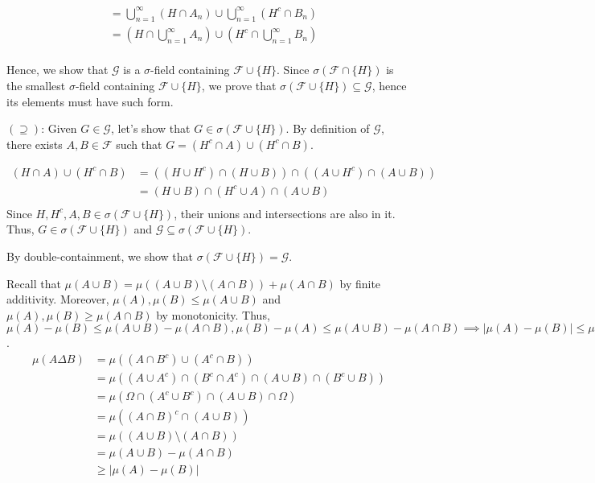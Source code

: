 \documentclass[12pt]{article}
\begin{document}
\begin{problem}[2]
\begin{enumerate}[label=(\roman*)]
\begin{align*}
						     &= \bigcup_{ n =1}^{\infty} (H \cap A_n) \cup \bigcup_{ n =1}^{\infty} (H^{c} \cap B_n) \\
						     &= \left(H \cap \bigcup_{ n =1}^{\infty} A_n \right) \cup \left(H^{c} \cap \bigcup_{ n =1}^{\infty} B_n \right) \\
		\end{align*}
\end{enumerate}
Hence, we show that $ \mathcal{G}$ is a $\sigma$-field containing $ \mathcal{F} \cup \{H\} $. Since $ \sigma(\mathcal{F} \cap \{H\}) $ is the smallest $\sigma$-field containing $ \mathcal{F} \cup \{H\} $, we prove that $ \sigma(\mathcal{F} \cup  \{H\} ) \subseteq \mathcal{G}$, hence its elements must have such form.

$ ( \supseteq )$: Given $ G \in \mathcal{G}$, let's show that $ G \in \sigma(\mathcal{F} \cup \{H\}) $. By definition of $ \mathcal{G}$, there exists $ A,B \in \mathcal{F}$ such that $ G= (H ^{c} \cap A) \cup (H^{c} \cap B)$.

\begin{align*}
	(H \cap A) \cup (H^{c} \cap B) &= ((H \cup H^{c}) \cap (H \cup B)) \cap ((A \cup H^{c}) \cap (A \cup B))\\
				       &= (H \cup B) \cap (H^{c} \cup A) \cap (A \cup B)  \\
\end{align*}
Since $ H, H^{c}, A, B \in \sigma(\mathcal{F} \cup \{H\} )$, their unions and intersections are also in it. Thus, $ G \in \sigma(\mathcal{F} \cup \{H\} )$ and $ \mathcal{G} \subseteq \sigma(\mathcal{F} \cup \{H\} )$.

By double-containment, we show that $ \sigma(\mathcal{F} \cup \{H\} ) = \mathcal{G}$.
\end{problem}

\begin{problem}[3]

	Recall that $ \mu(A \cup B) = \mu((A \cup B) \setminus (A \cap B)) + \mu(A \cap B)$ by finite additivity. Moreover, $ \mu(A), \mu(B) \leq \mu(A \cup B)$ and $ \mu(A), \mu(B) \geq \mu(A \cap B)$ by monotonicity. Thus, $\mu(A) - \mu(B) \leq \mu(A \cup B) - \mu(A \cap B), \mu(B) -\mu(A) \leq \mu(A \cup B) - \mu(A \cap B) \implies |\mu(A)-\mu(B)| \leq \mu(A \cup B) - \mu(A \cap B)$.
\begin{align*}
	\mu(A \Delta B) &= \mu((A \cap B^{c}) \cup (A^{c} \cap B)) \\
			&= \mu((A \cup A^{c}) \cap (B^{c} \cap A^{c}) \cap (A \cup B) \cap (B^{c} \cup B)) \\
			&= \mu(\Omega \cap (A^{c} \cup B^{c}) \cap (A \cup B) \cap \Omega) \\
			&= \mu((A \cap B)^{c} \cap (A \cup B)) \\
			&= \mu((A \cup B) \setminus (A \cap B)) \\
			&= \mu(A \cup B) - \mu(A \cap B) \\
			&\geq |\mu(A) - \mu(B)|  
\end{align*}
\end{problem}
\end{document}
